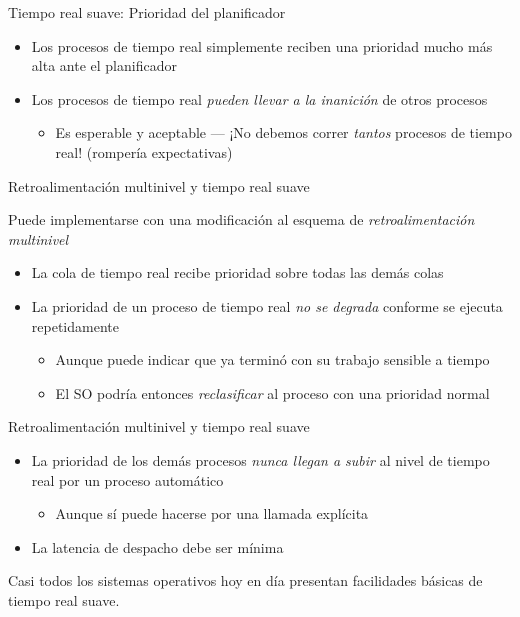 \documentclass[presentation]{beamer}
\begin{document}
\begin{frame}[label={sec:org64a025f}]{Tiempo real suave: Prioridad del planificador}
\begin{itemize}
\item Los procesos de tiempo real simplemente reciben una prioridad mucho
más alta ante el planificador
\item Los procesos de tiempo real \emph{pueden llevar a la inanición} de otros
procesos
\begin{itemize}
\item Es esperable y aceptable — ¡No debemos correr \emph{tantos} procesos de
tiempo real! (rompería expectativas)
\end{itemize}
\end{itemize}
\end{frame}

\begin{frame}[label={sec:orge7724a7}]{Retroalimentación multinivel y tiempo real suave}
\begin{center}
Puede implementarse con una modificación al esquema de
\emph{retroalimentación multinivel}
\end{center}
\begin{itemize}
\item La cola de tiempo real recibe prioridad sobre todas las demás colas
\item La prioridad de un proceso de tiempo real \emph{no se degrada} conforme
se ejecuta repetidamente
\begin{itemize}
\item Aunque puede indicar que ya terminó con su trabajo sensible a
tiempo
\item El SO podría entonces \emph{reclasificar} al proceso con una prioridad
normal
\end{itemize}
\end{itemize}
\end{frame}

\begin{frame}[label={sec:org2386e78}]{Retroalimentación multinivel y tiempo real suave}
\begin{itemize}
\item La prioridad de los demás procesos \emph{nunca llegan a subir} al nivel
de tiempo real por un proceso automático
\begin{itemize}
\item Aunque sí puede hacerse por una llamada explícita
\end{itemize}
\item La latencia de despacho debe ser mínima
\end{itemize}
\begin{center}
Casi todos los sistemas operativos hoy en día presentan facilidades
básicas de tiempo real suave.
\end{center}
\end{frame}
\end{document}
